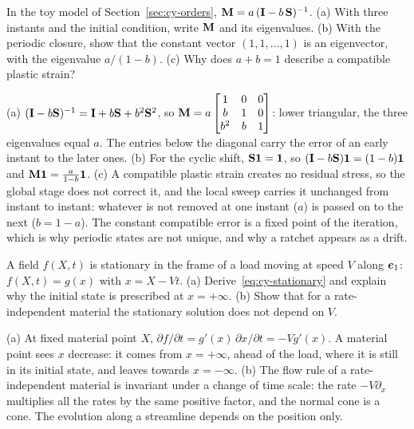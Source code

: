\label{exo:cy-q-toy}
%
In the toy model of Section~\ref{sec:cy-orders},
$\mathbf{M}=a\,(\mathbf{I}-b\,\mathbf{S})^{-1}$. (a) With three instants and the initial
condition, write $\mathbf{M}$ and its eigenvalues. (b) With the periodic closure,
show that the constant vector $(1,1,\dots,1)$ is an eigenvector, with the
eigenvalue $a/(1-b)$. (c) Why does $a+b=1$ describe a compatible plastic
strain?
\begin{solution}
(a) $(\mathbf{I}-b\mathbf{S})^{-1}=\mathbf{I}+b\mathbf{S}+b^2\mathbf{S}^2$, so
$\mathbf{M}=a\begin{bmatrix}1&0&0\\ b&1&0\\ b^2&b&1\end{bmatrix}$: lower triangular, the
three eigenvalues equal $a$. The entries below the diagonal carry the error of
an early instant to the later ones. (b) For the cyclic shift,
$\mathbf{S}\mathbf 1=\mathbf 1$, so $(\mathbf{I}-b\mathbf{S})\mathbf 1=(1-b)\mathbf 1$ and
$\mathbf{M}\mathbf 1=\frac{a}{1-b}\mathbf 1$. (c) A compatible plastic strain creates no
residual stress, so the global stage does not correct it, and the local
sweep carries it unchanged from instant to instant: whatever is not removed
at one instant ($a$) is passed on to the next ($b=1-a$). The constant
compatible error is a fixed point of the iteration, which is why periodic
states are not unique, and why a ratchet appears as a drift.
\end{solution}

\label{exo:cy-q-moving}
%
A field $f(X,t)$ is stationary in the frame of a load moving at speed $V$
along $\bm{e}_1$: $f(X,t)=g(x)$ with $x=X-Vt$. (a)
Derive~\eqref{eq:cy-stationary} and explain why the initial state is
prescribed at $x=+\infty$. (b) Show that for a rate-independent material the
stationary solution does not depend on $V$.
\begin{solution}
(a) At fixed material point $X$, $\partial f/\partial t=g'(x)\,\partial x/\partial t=-Vg'(x)$.
A material point sees $x$ decrease: it comes from $x=+\infty$, ahead of the
load, where it is still in its initial state, and leaves towards
$x=-\infty$. (b) The flow rule of a
rate-independent material is invariant under a change of time scale: the
rate $-V\partial_x$ multiplies all the rates by the same positive factor, and
the normal cone is a cone. The evolution along a streamline depends on the
position only.
\end{solution}

